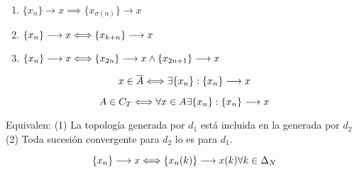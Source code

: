     \begin{prop} \\
        \begin{enumerate}
            \item $\{x_n\} \longrightarrow x \implies \{x_{\sigma(n)}\} \longrightarrow x $
            \item $\{x_n\} \longrightarrow x \Longleftrightarrow \{x_{k+n}\} \longrightarrow x $
            \item $\{x_n\} \longrightarrow x \Longleftrightarrow \{x_{2n}\} \longrightarrow x \wedge \{x_{2n+1}\} \longrightarrow x $
        \end{enumerate} 
    \end{prop}

    \begin{prop}
        $$x\in \overline{A} \\ \Longleftrightarrow \\ \exists\{x_n\} : \{x_n\} \longrightarrow x$$
    \end{prop}

    \begin{prop}
        $$A \in C_T \\ \Longleftrightarrow \\ \forall x\in A \\ \exists\{x_n\} : \{x_n\} \longrightarrow x$$
    \end{prop}

    \begin{prop}
        Equivalen:\newline
        (1) La topología generada por $d_1$ está incluida en la generada por $d_2$ \newline
        (2) Toda sucesión convergente para $d_2$ lo es para $d_1$.\newline
    \end{prop}
    
    \begin{prop}[Convergencia en $\rn$]
        $$\{x_n\} \longrightarrow x \\ \Longleftrightarrow \\ \{x_n(k)\} \longrightarrow x(k) \\ \forall k \in \Delta_N$$
    \end{prop}
    
    